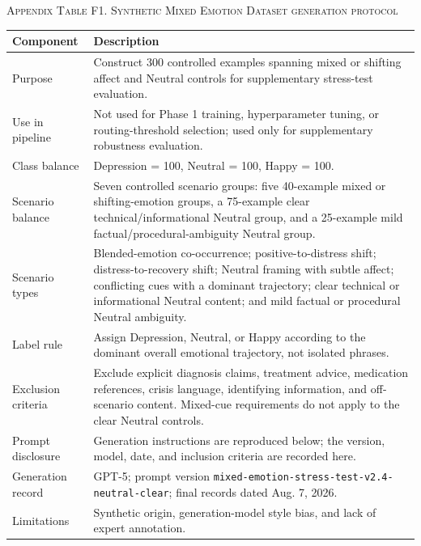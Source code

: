 \documentclass{ieeeaccess}
\begin{document}
\par\medskip
\noindent\textsc{Appendix Table F1. Synthetic Mixed Emotion Dataset generation protocol}\par
\label{tab:appendix-a5-mixed-emotion-protocol}
\smallskip
\small
\setlength{\tabcolsep}{4pt}
\renewcommand{\arraystretch}{1.08}
\noindent\begin{tabularx}{\textwidth}{@{}>{\raggedright\arraybackslash}p{}Y@{}}
\toprule
Component & Description \\
\midrule
Purpose & Construct 300 controlled examples spanning mixed or shifting affect and Neutral controls for supplementary stress-test evaluation. \\
Use in pipeline & Not used for Phase 1 training, hyperparameter tuning, or routing-threshold selection; used only for supplementary robustness evaluation. \\
Class balance & Depression = 100, Neutral = 100, Happy = 100. \\
Scenario balance & Seven controlled scenario groups: five 40-example mixed or shifting-emotion groups, a 75-example clear technical/informational Neutral group, and a 25-example mild factual/procedural-ambiguity Neutral group. \\
Scenario types & Blended-emotion co-occurrence; positive-to-distress shift; distress-to-recovery shift; Neutral framing with subtle affect; conflicting cues with a dominant trajectory; clear technical or informational Neutral content; and mild factual or procedural Neutral ambiguity. \\
Label rule & Assign Depression, Neutral, or Happy according to the dominant overall emotional trajectory, not isolated phrases. \\
Exclusion criteria & Exclude explicit diagnosis claims, treatment advice, medication references, crisis language, identifying information, and off-scenario content. Mixed-cue requirements do not apply to the clear Neutral controls. \\
Prompt disclosure & Generation instructions are reproduced below; the version, model, date, and inclusion criteria are recorded here. \\
Generation record & GPT-5; prompt version \texttt{mixed-emotion-stress-test-v2.4-neutral-clear}; final records dated Aug. 7, 2026. \\
Limitations & Synthetic origin, generation-model style bias, and lack of expert annotation. \\
\bottomrule
\end{tabularx}
\par\medskip
\end{document}
